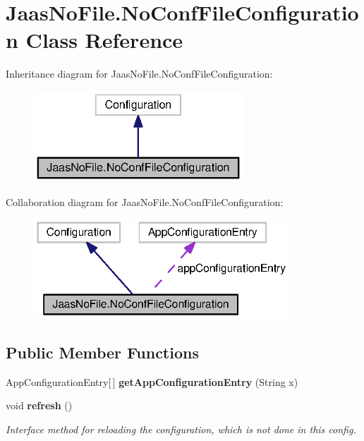 \section{Jaas\-No\-File.\-No\-Conf\-File\-Configuration Class Reference}
\label{classorg_1_1smallfoot_1_1jaas_1_1JaasNoFile_1_1NoConfFileConfiguration}


Inheritance diagram for Jaas\-No\-File.\-No\-Conf\-File\-Configuration\-:\nopagebreak
\begin{figure}[H]
\begin{center}
\leavevmode
\includegraphics[width=222pt]{classorg_1_1smallfoot_1_1jaas_1_1JaasNoFile_1_1NoConfFileConfiguration__inherit__graph}
\end{center}
\end{figure}


Collaboration diagram for Jaas\-No\-File.\-No\-Conf\-File\-Configuration\-:\nopagebreak
\begin{figure}[H]
\begin{center}
\leavevmode
\includegraphics[width=271pt]{classorg_1_1smallfoot_1_1jaas_1_1JaasNoFile_1_1NoConfFileConfiguration__coll__graph}
\end{center}
\end{figure}
\subsection*{Public Member Functions}
\begin{DoxyCompactItemize}
\item 
App\-Configuration\-Entry[$\,$] {\bfseries get\-App\-Configuration\-Entry} (String x)\label{classorg_1_1smallfoot_1_1jaas_1_1JaasNoFile_1_1NoConfFileConfiguration_a7b64232f7d996279c40eb859a017c11b}

\item 
void {\bf refresh} ()
\begin{DoxyCompactList}\small\item\em Interface method for reloading the configuration, which is not done in this config. \end{DoxyCompactList}\end{DoxyCompactItemize}
